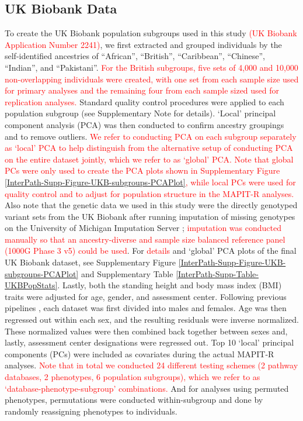 \documentclass[10pt]{article}
\begin{document}
\subsection*{UK Biobank Data} 

To create the UK Biobank population subgroups used in this study \textcolor{red}{(UK Biobank Application Number 2241)}, we first extracted and grouped individuals by the self-identified ancestries of ``African'', ``British'', ``Caribbean'', ``Chinese'', ``Indian'', and ``Pakistani''. \textcolor{red}{For the British subgroups, five sets of 4,000 and 10,000 non-overlapping individuals were created, with one set from each sample size used for primary analyses and the remaining four from each sample sized used for replication analyses.} Standard quality control procedures were applied to each population subgroup (see Supplementary Note for details). `Local' principal component analysis (PCA) was then conducted to confirm ancestry groupings and to remove outliers. \textcolor{red}{We refer to conducting PCA on each subgroup separately as `local' PCA to help distinguish from the alternative setup of conducting PCA on the entire dataset jointly, which we refer to as `global' PCA. Note that global PCs were only used to create the PCA plots shown in Supplementary Figure \ref{InterPath-Supp-Figure-UKB-subgroups-PCAPlot}, while local PCs were used for quality control and to adjust for population structure in the MAPIT-R analyses.} Also note that the genetic data we used in this study were the directly genotyped variant sets from the UK Biobank after running imputation of missing genotypes on the University of Michigan Imputation Server \cite{Das2016}; \textcolor{red}{imputation was conducted manually so that an ancestry-diverse and sample size balanced reference panel (1000G Phase 3 v5) could be used}. For \textcolor{red}{details} and `global' PCA plots of the final UK Biobank dataset, see Supplementary Figure \ref{InterPath-Supp-Figure-UKB-subgroups-PCAPlot} and Supplementary Table \ref{InterPath-Supp-Table-UKBPopStats}. Lastly, both the standing height and body mass index (BMI) traits were adjusted for age, gender, and assessment center. Following previous pipelines \cite{Wood2014a,Locke2015}, each dataset was first divided into males and females. Age was then regressed out within each sex, and the resulting residuals were inverse normalized. These normalized values were then combined back together between sexes and, lastly, assessment center designations were regressed out. Top 10 `local' principal components (PCs) were included as covariates during the actual MAPIT-R analyses. \textcolor{red}{Note that in total we conducted 24 different testing schemes (2 pathway databases, 2 phenotypes, 6 population subgroups), which we refer to as `database-phenotype-subgroup' combinations.} And for analyses using permuted phenotypes, permutations were conducted within-subgroup and done by randomly reassigning phenotypes to individuals.
\end{document}

